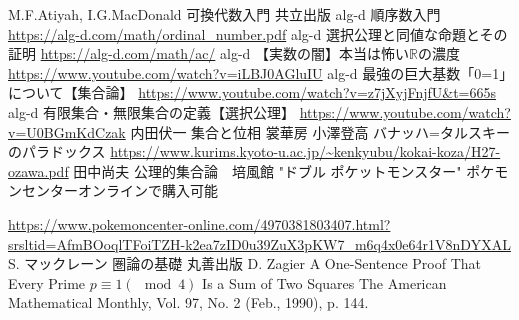 \documentclass[dvipdfmx,a4paper,11pt]{article}
\newcommand{\R}{\mathbb{R}}
\theoremstyle{definition}
\begin{document}
\begin{thebibliography}{n}
M.F.Atiyah,  I.G.MacDonald 可換代数入門 共立出版
alg-d 順序数入門
\url{https://alg-d.com/math/ordinal_number.pdf}
alg-d 選択公理と同値な命題とその証明
\url{https://alg-d.com/math/ac/}
alg-d 【実数の闇】本当は怖い$\R$の濃度
\url{https://www.youtube.com/watch?v=iLBJ0AGluIU}
alg-d 最強の巨大基数「0=1」について【集合論】
\url{https://www.youtube.com/watch?v=z7jXyjFnjfU&t=665s}
alg-d 有限集合・無限集合の定義【選択公理】
\url{https://www.youtube.com/watch?v=U0BGmKdCzak}
内田伏一 集合と位相 裳華房
小澤登高 バナッハ=タルスキーのパラドックス
\url{https://www.kurims.kyoto-u.ac.jp/~kenkyubu/kokai-koza/H27-ozawa.pdf}
田中尚夫 公理的集合論　培風館
"ドブル ポケットモンスター" ポケモンセンターオンラインで購入可能

\url{https://www.pokemoncenter-online.com/4970381803407.html?srsltid=AfmBOoqlTFoiTZH-k2ea7zID0u39ZuX3pKW7_m6q4x0e64r1V8nDYXAL}
S. マックレーン 圏論の基礎 丸善出版
D. Zagier A One-Sentence Proof That Every Prime $p\equiv 1(\mod 4)$ Is a Sum of Two Squares
The American Mathematical Monthly, Vol. 97, No. 2 (Feb., 1990), p. 144.
\end{thebibliography}
 
 
\end{document}
